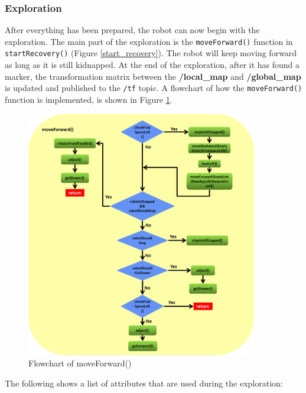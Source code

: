\subsubsection{Exploration} \label{subsection:implementation_exploration}

After everything has been prepared, the robot can now begin with the exploration. The main part of the exploration is the \texttt{moveForward()} function in \texttt{startRecovery()} (Figure \ref{start_recovery}). The robot will keep moving forward as long as it is still kidnapped. At the end of the exploration, after it has found a marker, the transformation matrix between the \textbf{/local\_map} and \textbf{/global\_map} is updated and published to the \texttt{/tf} topic. A flowchart of how the \texttt{moveForward()} function is implemented, is shown in Figure \ref{move_forward}.

\begin{figure}[htb]
\centering
\includegraphics[width=0.9\textwidth]{graphics/move_forward.png}
\caption{Flowchart of moveForward()}
\label{move_forward}
\centering
\end{figure}

The following shows a list of attributes that are used during the exploration:

